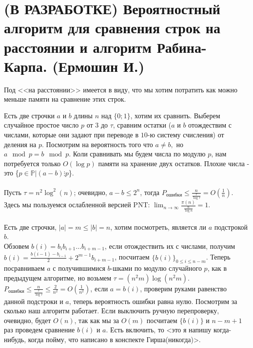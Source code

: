 \section{(В РАЗРАБОТКЕ) Вероятностный алгоритм для сравнения строк на расстоянии и алгоритм Рабина-Карпа. (Ермошин И.)}


Под <<на расстоянии>> имеется в виду, что мы хотим потратить как можно меньше памяти на сравнение этих строк.

Есть две строчки $a$ и $b$ длины $n$ над $\{0;1\}$, хотим их сравнить. Выберем случайное простое число $p$ от $3$ до $\tau$, сравним остатки ($a$ и $b$ отождествим с числами, которые они задают при переводе в $10$-ю систему счисления) от деления на $p$. Посмотрим на вероятность того что $a\neq b,$ но $a\mod{p}=b\mod{p}$. Коли сравнивать мы будем числа по модулю $p$, нам потребуется только $O(\log p)$ памяти на хранение двух остатков.
Плохие числа - это \{$p\in\mathbb{P} | (a-b)\vdots p$\}.
\\
\\Пусть $\tau=n^2 \log^2(n)$; очевидно, $a-b\le 2^n$, тогда $P_{\text{ошибки}}\le\frac{n}{\frac{\tau}{\log\tau}}=O(\frac{1}{n})$. Здесь мы пользуемся ослабленной версией PNT: $\lim_{n\to\infty} \frac{\pi(n)}{\frac{n}{\log n}}=1$.
\\
\\
Есть две строчки, $|a|=m\le|b|=n$, хотим посмотреть, является ли $a$ подстрокой $b$.
\\Обзовем $b(i)=b_i b_{i+1}\ldots b_{i+m-1}$, если отождествить их с числами, получим $b(i)=\frac{b(i-1)-b_{i-1}}{2}+2^{m-1} b_{i+m-1}$, посчитаем $\{b(i)\}_{0\le i\le n-m}$. Теперь посравниваем $a$ с получившимися $b$-шками по модулю случайного $p$, как в предыдущем алгоритме, но возьмем $\tau=(n^2m)\log(n^2m)$.$P_{\text{ошибки}}\le\frac{n}{\frac{\tau}{\log\tau}}\le\frac{2}{n^2}=O(\frac{1}{n^2})$, если $a=b(i)$, проверим руками равенство данной подстроки и $a$, теперь вероятность ошибки равна нулю. Посмотрим за сколько наш алгоритм работает. Если выключить ручную перепроверку, очевидно, будет $O(n)$, так как мы за $O(m)$ посчитаем $\{b(i)\}$ и $n-m+1$ раз проведем сравнение $b(i)$ и $a$. Есть включить, то <это я напишу когда-нибудь, когда пойму, что написано в конспекте Гирша(никогда)>.